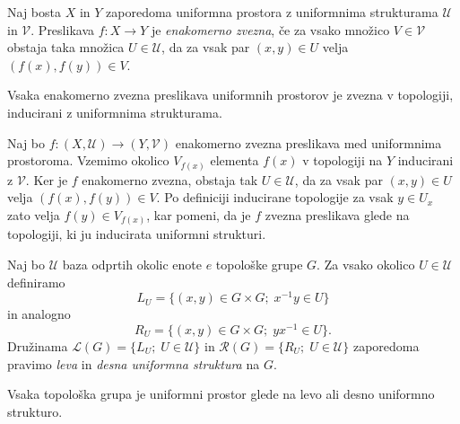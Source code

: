 \documentclass[mat1]{fmfdelo}
\newcommand{\Ucurl}{\mathcal{U}}
\begin{document}
\begin{definicija}\label{def:enakzveznost}
	Naj bosta $X$ in $Y$ zaporedoma uniformna prostora z uniformnima strukturama $\mathcal{U}$ in $\mathcal{V}$. Preslikava $f\colon X \to Y$ je \emph{enakomerno zvezna}, če za vsako množico $V \in \mathcal{V}$ obstaja taka množica $U \in \mathcal{U}$, da za vsak par $(x, y) \in U$ velja $(f(x), f(y)) \in V$.
\end{definicija}

\begin{trditev}\label{trd:enakzveznazvezna}
	Vsaka enakomerno zvezna preslikava uniformnih prostorov je zvezna v topologiji, inducirani z uniformnima strukturama.
\end{trditev}

\begin{dokaz}
	Naj bo $f\colon (X, \mathcal{U}) \to (Y, \mathcal{V})$ enakomerno zvezna preslikava med uniformnima prostoroma. Vzemimo okolico $V_{f(x)}$ elementa $f(x)$ v topologiji na $Y$ inducirani z $\mathcal{V}$. Ker je $f$ enakomerno zvezna, obstaja tak $U \in \mathcal{U}$, da za vsak par $(x, y) \in U$ velja $(f(x), f(y)) \in V$. Po definiciji inducirane topologije za vsak $y \in U_x$ zato velja $f(y) \in V_{f(x)}$, kar pomeni, da je $f$ zvezna preslikava glede na topologiji, ki ju inducirata uniformni strukturi.
\end{dokaz}

\begin{definicija}\label{def:levadesnauni}
	Naj bo $\Ucurl$ baza odprtih okolic enote $e$ topološke grupe $G$. Za vsako okolico $U \in \Ucurl$ definiramo \[L_U = \lbrace (x, y) \in G \times G ;\; x^{-1}y \in U \rbrace\] in analogno \[R_U = \lbrace (x, y) \in G \times G ;\; yx^{-1} \in U \rbrace.\] Družinama $\mathcal{L}(G) = \lbrace L_U ;\; U \in \Ucurl\rbrace$ in $\mathcal{R}(G) = \lbrace R_U ;\; U \in \Ucurl\rbrace$ zaporedoma pravimo \emph{leva} in \emph{desna uniformna struktura} na $G$.
\end{definicija}

\begin{trditev}\label{trd:topguniform}
	Vsaka topološka grupa je uniformni prostor glede na levo ali desno uniformno strukturo.
\end{trditev}
\end{document}
